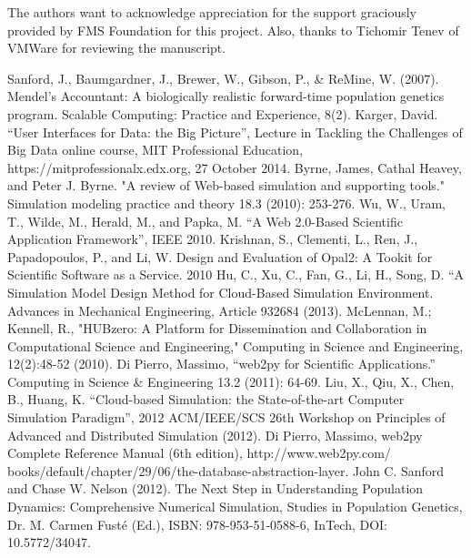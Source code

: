 \documentclass[10pt,reprint]{socc14}
\begin{document}

\acks

The authors want to acknowledge appreciation for the support graciously provided by FMS Foundation for this project.  Also, thanks to Tichomir Tenev of VMWare for reviewing the manuscript. 




\begin{thebibliography}{}
\softraggedright

 Sanford, J., Baumgardner, J., Brewer, W., Gibson, P., \& ReMine, W. (2007). Mendel's Accountant: A biologically realistic forward-time population genetics program. Scalable Computing: Practice and Experience, 8(2).
 Karger, David. “User Interfaces for Data: the Big Picture”, Lecture in Tackling the Challenges of Big Data online course, MIT Professional Education, https://mitprofessionalx.edx.org, 27 October 2014.
 Byrne, James, Cathal Heavey, and Peter J. Byrne. "A review of Web-based simulation and supporting tools." Simulation modeling practice and theory 18.3 (2010): 253-276.
 Wu, W., Uram, T., Wilde, M., Herald, M., and Papka, M. “A Web 2.0-Based Scientific Application Framework”, IEEE 2010.
 Krishnan, S., Clementi, L., Ren, J., Papadopoulos, P., and Li, W.  Design and Evaluation of Opal2: A Tookit for Scientific Software as a Service. 2010
 Hu, C., Xu, C., Fan, G., Li, H., Song, D. “A Simulation Model Design Method for Cloud-Based Simulation Environment.  Advances in Mechanical Engineering, Article 932684 (2013).
 McLennan, M.; Kennell, R., "HUBzero: A Platform for Dissemination and Collaboration in Computational Science and Engineering," Computing in Science and Engineering, 12(2):48-52 (2010).
 Di Pierro, Massimo, “web2py for Scientific Applications.” Computing in Science \& Engineering 13.2 (2011): 64-69.
 Liu, X., Qiu, X., Chen, B., Huang, K. “Cloud-based Simulation: the State-of-the-art Computer Simulation Paradigm”, 2012 ACM/IEEE/SCS 26th Workshop on Principles of Advanced and Distributed Simulation (2012).
 Di Pierro, Massimo, web2py Complete Reference Manual (6th edition), http://www.web2py.com/ books/default/chapter/29/06/the-database-abstraction-layer.
 John C. Sanford and Chase W. Nelson (2012). The Next Step in Understanding Population Dynamics: Comprehensive Numerical Simulation, Studies in Population Genetics, Dr. M. Carmen  Fusté (Ed.), ISBN: 978-953-51-0588-6, InTech, DOI: 10.5772/34047.

\end{thebibliography}
\end{document}
